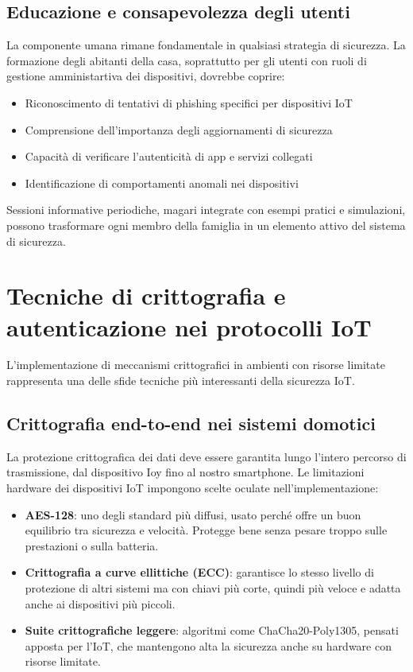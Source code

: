 \subsection{Educazione e consapevolezza degli utenti}

La componente umana rimane fondamentale in qualsiasi strategia di sicurezza. La formazione degli abitanti della casa, soprattutto per gli utenti con ruoli di gestione amministartiva dei dispositivi,  dovrebbe coprire:

\begin{itemize}
    \item Riconoscimento di tentativi di phishing specifici per dispositivi IoT
    \item Comprensione dell'importanza degli aggiornamenti di sicurezza
    \item Capacità di verificare l'autenticità di app e servizi collegati
    \item Identificazione di comportamenti anomali nei dispositivi
\end{itemize}

Sessioni informative periodiche, magari integrate con esempi pratici e simulazioni, possono trasformare ogni membro della famiglia in un elemento attivo del sistema di sicurezza.

\section{Tecniche di crittografia e autenticazione nei protocolli IoT}

L'implementazione di meccanismi crittografici in ambienti con risorse limitate rappresenta una delle sfide tecniche più interessanti della sicurezza IoT.

\subsection{Crittografia end-to-end nei sistemi domotici}

La protezione crittografica dei dati deve essere garantita lungo l'intero percorso di trasmissione, dal dispositivo Ioy fino al nostro smartphone. Le limitazioni hardware dei dispositivi IoT impongono scelte oculate nell'implementazione:

\begin{itemize}
    \item \textbf{AES-128}: uno degli standard più diffusi, usato perché offre un buon equilibrio tra sicurezza e velocità. Protegge bene senza pesare troppo sulle prestazioni o sulla batteria.
    \item \textbf{Crittografia a curve ellittiche (ECC)}: garantisce lo stesso livello di protezione di altri sistemi ma con chiavi più corte, quindi più veloce e adatta anche ai dispositivi più piccoli.
    \item \textbf{Suite crittografiche leggere}: algoritmi come ChaCha20-Poly1305, pensati apposta per l’IoT, che mantengono alta la sicurezza anche su hardware con risorse limitate.
\end{itemize}
